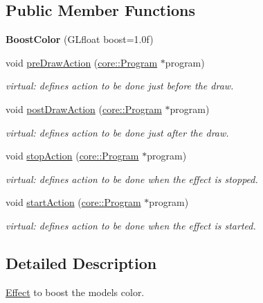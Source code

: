 \subsection*{Public Member Functions}
\begin{DoxyCompactItemize}
\item 
\hypertarget{classfillwave_1_1effects_1_1BoostColor_a6971fc6fc68d3dc3b6aa448164ebb6e2}{}{\bfseries Boost\+Color} (G\+Lfloat boost=1.\+0f)\label{classfillwave_1_1effects_1_1BoostColor_a6971fc6fc68d3dc3b6aa448164ebb6e2}

\item 
void \hyperlink{classfillwave_1_1effects_1_1BoostColor_ae5cbdf0c8487e4ee9743f39f9a6bf247}{pre\+Draw\+Action} (\hyperlink{classfillwave_1_1core_1_1Program}{core\+::\+Program} $\ast$program)
\begin{DoxyCompactList}\small\item\em virtual\+: defines action to be done just before the draw. \end{DoxyCompactList}\item 
void \hyperlink{classfillwave_1_1effects_1_1BoostColor_aeee3b3de532b1ea6aaac80590aa7f081}{post\+Draw\+Action} (\hyperlink{classfillwave_1_1core_1_1Program}{core\+::\+Program} $\ast$program)
\begin{DoxyCompactList}\small\item\em virtual\+: defines action to be done just after the draw. \end{DoxyCompactList}\item 
void \hyperlink{classfillwave_1_1effects_1_1BoostColor_a25ebaad4e773c6a4a147744655955a59}{stop\+Action} (\hyperlink{classfillwave_1_1core_1_1Program}{core\+::\+Program} $\ast$program)
\begin{DoxyCompactList}\small\item\em virtual\+: defines action to be done when the effect is stopped. \end{DoxyCompactList}\item 
void \hyperlink{classfillwave_1_1effects_1_1BoostColor_aad6fdc26934cbdcd0cec735c987e653e}{start\+Action} (\hyperlink{classfillwave_1_1core_1_1Program}{core\+::\+Program} $\ast$program)
\begin{DoxyCompactList}\small\item\em virtual\+: defines action to be done when the effect is started. \end{DoxyCompactList}\end{DoxyCompactItemize}


\subsection{Detailed Description}
\hyperlink{classfillwave_1_1effects_1_1Effect}{Effect} to boost the models color. 

